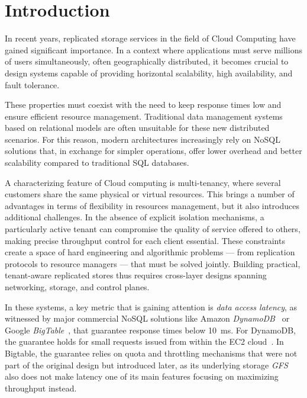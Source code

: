 \section{Introduction}
\label{sec:introduction}
In recent years, replicated storage services in the field of Cloud Computing have gained significant importance.
In a context where applications must serve millions of users simultaneously, often geographically distributed,
it becomes crucial to design systems capable of providing horizontal scalability, high availability, and fault tolerance.

These properties must coexist with the need to keep response times low and ensure efficient resource management.
Traditional data management systems based on relational models are often unsuitable for these new distributed scenarios.
For this reason, modern architectures increasingly rely on NoSQL solutions that, in exchange for simpler operations,
offer lower overhead and better scalability compared to traditional SQL databases.

A characterizing feature of Cloud computing is multi-tenancy, where several customers share the same physical or virtual resources.
This brings a number of advantages in terms of flexibility in resources management, but it also introduces additional challenges.
In the absence of explicit isolation mechanisms, a particularly active tenant can compromise the quality of service offered to others,
making precise throughput control for each client essential.
These constraints create a space of hard engineering and algorithmic problems --- from replication protocols to resource managers --- that must be solved jointly.
Building practical, tenant-aware replicated stores thus requires cross-layer designs spanning networking, storage, and control planes.

In these systems,
a key metric that is gaining attention is \emph{data access latency}, as witnessed
by major commercial NoSQL solutions like Amazon \textit{DynamoDB}~\cite{Dynamo2022} or Google \textit{BigTable}~\cite{Bigtable}, that guarantee response times below \qty{10}{\milli\second}. For DynamoDB, the guarantee holds for small requests issued from within the EC2 cloud~\cite{DynamoWhitepaper}. In Bigtable, the guarantee relies on quota and throttling mechanisms that were not part of the original design but introduced later, as
its underlying storage \textit{GFS}~\cite{GFS} also does not make latency one of its main features
focusing on maximizing throughput instead. %

